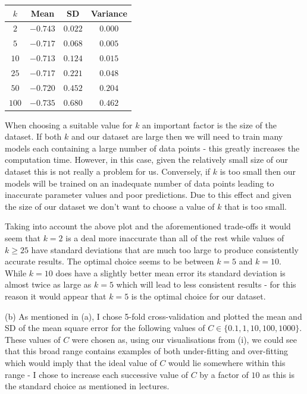 \documentclass[12pt]{article}
\begin{document}
\begin{center}
    \begin{tabular}{|c|c|c|c|}
        \hline
        $k$ & Mean & SD & Variance \\
        \hline
        $2$ & $-0.743$ & $0.022$ & $0.000$ \\
        \hline
        $5$ & $-0.717$ & $0.068$ & $0.005$ \\
        \hline
        $10$ & $-0.713$ & $0.124$ & $0.015$ \\
        \hline
        $25$ & $-0.717$ & $0.221$ & $0.048$ \\
        \hline
        $50$ & $-0.720$ & $0.452$ & $0.204$ \\
        \hline
        $100$ & $-0.735$ & $0.680$ & $0.462$ \\
        \hline
    \end{tabular}
\end{center}

When choosing a suitable value for $k$ an important factor is the size of the dataset. If both $k$ and our dataset are large then we will need to train many models each containing a large number of data points - this greatly increases the computation time. However, in this case, given the relatively small size of our dataset this is not really a problem for us. Conversely, if $k$ is too small then our models will be trained on an inadequate number of data points leading to inaccurate parameter values and poor predictions. Due to this effect and given the size of our dataset we don't want to choose a value of $k$ that is too small.

Taking into account the above plot and the aforementioned trade-offs it would seem that $k = 2$ is a deal more inaccurate than all of the rest while values of $k \geq 25$ have standard deviations that are much too large to produce consistently accurate results. The optimal choice seems to be between $k = 5$ and $k = 10$. While $k = 10$ does have a slightly better mean error its standard deviation is almost twice as large as $k = 5$ which will lead to less consistent results - for this reason it would appear that $k = 5$ is the optimal choice for our dataset.

\noindent (b) As mentioned in (a), I chose 5-fold cross-validation and plotted the mean and SD of the mean square error for the following values of $C \in \{0.1, 1, 10, 100, 1000\}$. These values of $C$ were chosen as, using our visualisations from (i), we could see that this broad range contains examples of both under-fitting and over-fitting which would imply that the ideal value of $C$ would lie somewhere within this range - I chose to increase each successive value of $C$ by a factor of $10$ as this is the standard choice as mentioned in lectures.
\end{document}
